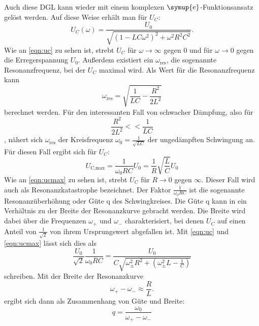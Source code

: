 \noindent Auch diese DGL kann wieder mit einem komplexen $\symup{e}$-Funktionsansatz gelöst werden. Auf diese Weise erhält man für $U_C$:
\begin{equation}
    U_C(\omega) = \frac{U_0}{\sqrt{(1-LC\omega^2)^2 + \omega^2 R^2 C^2}}.
    \label{eqn:uc}
\end{equation}
\noindent Wie an \autoref{eqn:uc} zu sehen ist, strebt $U_C$ für $\omega \to \infty $ gegen 0 und für $\omega \to 0$ gegen die Erregerspannung $U_0$. Außerdem existiert ein $\omega_{\text{res}}$, die sogenannte Resonanzfrequenz, bei der $U_C$ maximal wird. Als Wert für die Resonanzfrequenz kann
\begin{equation}
    \omega_{\text{res}} = \sqrt{\frac{1}{LC}-\frac{R^2}{2L^2}} 
\end{equation}
\noindent berechnet werden. Für den interessanten Fall von schwacher Dämpfung, also für
\begin{equation*}
    \frac{R^2}{2L^2} << \frac{1}{LC}
\end{equation*}
, nähert sich $\omega_{\text{res}}$ der Kreisfrequenz $\omega_0=\frac{1}{\sqrt{LC}}$ der ungedämpften Schwingung an. Für diesen Fall ergibt sich für $U_C$:
\begin{equation}
    U_{\text{C,max}} = \frac{1}{\omega_0 RC} U_0 = \frac{1}{R} \sqrt{\frac{L}{C}} U_0 
    \label{eqn:ucmax}
\end{equation}
Wie an \autoref{eqn:ucmax} zu sehen ist, strebt $U_C$ für $R \to 0 $ gegen $\infty$. Dieser Fall wird auch als Resonanzkatastrophe bezeichnet. Der Faktor $\frac{1}{\omega_0 RC}$ ist die sogenannte Resonanzüberhöhung oder Güte q des Schwingkreises.
\newline
Die Güte q kann in ein Verhältnis zu der Breite der Resonanzkurve gebracht werden. Die Breite wird dabei über die Frequenzen  $\omega_+$ und $\omega_-$ charakterisiert, bei denen $U_C$ auf einen Anteil von $\frac{1}{\sqrt{2}}$ von ihrem Ursprungswert abgefallen ist. Mit \autoref{eqn:uc} und \autoref{eqn:ucmax} lässt sich dies als
\begin{equation}
    \frac{U_0}{\sqrt{2}} \frac{1}{\omega_0 RC} = \frac{U_0}{C \sqrt{\omega^2_{\pm} R^2 + ( \omega^2_{\pm}L - \frac{1}{C} ) }}
\end{equation} 
schreiben. Mit der Breite der Resonanzkurve
\begin{equation}
    \omega_+ - \omega_- \approx \frac{R}{L}.
    \label{eqn:breite}
\end{equation}
ergibt sich dann als Zusammenhang von Güte und Breite:
\begin{equation}
    q = \frac{\omega_0}{\omega_+ - \omega_-}
    \label{eqn:guete}
\end{equation}